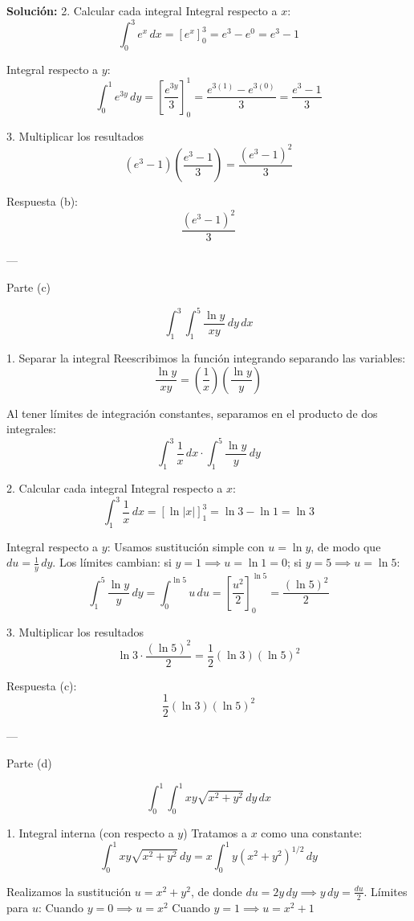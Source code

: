 \documentclass[12pt,a4paper]{report}
\newcommand{\solutionname}{Solución:}
\newenvironment{solution}{
 	\par\noindent\textbf{\color{structurecolor}\solutionname}
 	\color{black!90}}{\hfill\quad\par}
\begin{document}
\begin{solution}
 2. Calcular cada integral
 Integral respecto a $x$:
  $$\int_{0}^{3} e^x \, dx = \left[ e^x \right]_{0}^{3} = e^3 - e^0 = e^3 - 1$$

  Integral respecto a $y$:
  $$\int_{0}^{1} e^{3y} \, dy = \left[ \frac{e^{3y}}{3} \right]_{0}^{1} = \frac{e^{3(1)} - e^{3(0)}}{3} = \frac{e^3 - 1}{3}$$

 3. Multiplicar los resultados
$$\left( e^3 - 1 \right) \left( \frac{e^3 - 1}{3} \right) = \frac{(e^3 - 1)^2}{3}$$

Respuesta (b):
$$\frac{(e^3 - 1)^2}{3}$$

---

 Parte (c)

$$\int_{1}^{3} \int_{1}^{5} \frac{\ln y}{xy} \, dy \, dx$$

 1. Separar la integral
Reescribimos la función integrando separando las variables:
$$\frac{\ln y}{xy} = \left( \frac{1}{x} \right) \left( \frac{\ln y}{y} \right)$$

Al tener límites de integración constantes, separamos en el producto de dos integrales:
$$\int_{1}^{3} \frac{1}{x} \, dx \cdot \int_{1}^{5} \frac{\ln y}{y} \, dy$$

 2. Calcular cada integral
 Integral respecto a $x$:
  $$\int_{1}^{3} \frac{1}{x} \, dx = \left[ \ln|x| \right]_{1}^{3} = \ln 3 - \ln 1 = \ln 3$$

 Integral respecto a $y$:
  Usamos sustitución simple con $u = \ln y$, de modo que $du = \frac{1}{y} \, dy$.  
  Los límites cambian: si $y = 1 \implies u = \ln 1 = 0$; si $y = 5 \implies u = \ln 5$:
  $$\int_{1}^{5} \frac{\ln y}{y} \, dy = \int_{0}^{\ln 5} u \, du = \left[ \frac{u^2}{2} \right]_{0}^{\ln 5} = \frac{(\ln 5)^2}{2}$$

 3. Multiplicar los resultados
$$\ln 3 \cdot \frac{(\ln 5)^2}{2} = \frac{1}{2} (\ln 3)(\ln 5)^2$$

Respuesta (c):
$$\frac{1}{2} (\ln 3)(\ln 5)^2$$

---

 Parte (d)

$$\int_{0}^{1} \int_{0}^{1} xy\sqrt{x^2 + y^2} \, dy \, dx$$

 1. Integral interna (con respecto a $y$)
Tratamos a $x$ como una constante:
$$\int_{0}^{1} xy\sqrt{x^2 + y^2} \, dy = x \int_{0}^{1} y(x^2 + y^2)^{1/2} \, dy$$

Realizamos la sustitución $u = x^2 + y^2$, de donde $du = 2y \, dy \implies y \, dy = \frac{du}{2}$.  
Límites para $u$:
 Cuando $y = 0 \implies u = x^2$
 Cuando $y = 1 \implies u = x^2 + 1$


\end{solution}
\end{document}
